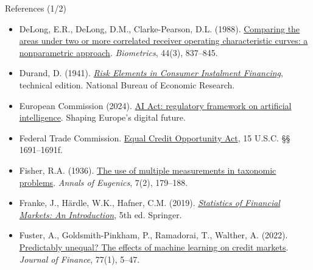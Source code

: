 \begin{frame}{References (1/2)}
\begin{itemize}
    \item DeLong, E.R., DeLong, D.M., Clarke-Pearson, D.L. (1988). \href{https://doi.org/10.2307/2531595}{Comparing the areas under two or more correlated receiver operating characteristic curves: a nonparametric approach}. \textit{Biometrics}, 44(3), 837--845.
    \item Durand, D. (1941). \href{https://www.nber.org/books-and-chapters/risk-elements-consumer-instalment-financing-technical-edition}{\textit{Risk Elements in Consumer Instalment Financing}}, technical edition. National Bureau of Economic Research.
    \item European Commission (2024). \href{https://digital-strategy.ec.europa.eu/en/policies/regulatory-framework-ai}{AI Act: regulatory framework on artificial intelligence}. Shaping Europe's digital future.
    \item Federal Trade Commission. \href{https://www.ftc.gov/legal-library/browse/statutes/equal-credit-opportunity-act}{Equal Credit Opportunity Act}, 15 U.S.C. §§ 1691--1691f.
    \item Fisher, R.A. (1936). \href{https://doi.org/10.1111/j.1469-1809.1936.tb02137.x}{The use of multiple measurements in taxonomic problems}. \textit{Annals of Eugenics}, 7(2), 179--188.
    \item Franke, J., Härdle, W.K., Hafner, C.M. (2019). \href{https://doi.org/10.1007/978-3-030-13751-9}{\textit{Statistics of Financial Markets: An Introduction}}, 5th ed. Springer.
    \item Fuster, A., Goldsmith-Pinkham, P., Ramadorai, T., Walther, A. (2022). \href{https://doi.org/10.1111/jofi.13090}{Predictably unequal? The effects of machine learning on credit markets}. \textit{Journal of Finance}, 77(1), 5--47.
\end{itemize}
\end{frame}

